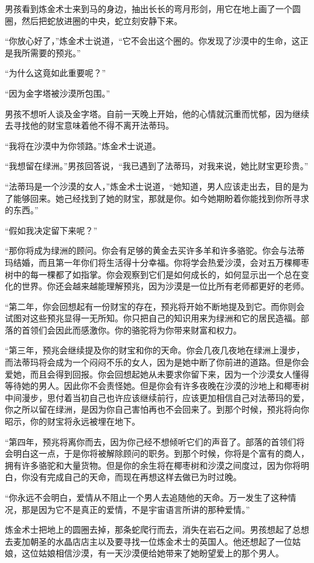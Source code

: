 \documentclass[twoside,openany]{book}
\begin{document}
男孩看到炼金术士来到马的身边，抽出长长的弯月形剑，用它在地上画了一个圆圈，然后把蛇放进圈的中央，蛇立刻安静下来。

“你放心好了，”炼金术士说道，“它不会出这个圈的。你发现了沙漠中的生命，这正是我所需要的预兆。”

“为什么这竟如此重要呢？”

“因为金字塔被沙漠所包围。”

男孩不想听人谈及金字塔。自前一天晚上开始，他的心情就沉重而忧郁，因为继续去寻找他的财宝意味着他不得不离开法蒂玛。

“我将在沙漠中为你领路。”炼金术士说道。

“我想留在绿洲。”男孩回答说，“我已遇到了法蒂玛，对我来说，她比财宝更珍贵。”

“法蒂玛是一个沙漠的女人，”炼金术士说道，“她知道，男人应该走出去，目的是为了能够回来。她己经找到了她的财宝，那就是你。如今她期盼着你能找到你所寻求的东西。”

“假如我决定留下来呢？”

“那你将成为绿洲的顾问。你会有足够的黄金去买许多羊和许多骆驼。你会与法蒂玛结婚，而且第一年你们将生活得十分幸福。你将学会热爱沙漠，会对五万棵椰枣树中的每一棵都了如指掌。你会观察到它们是如何成长的，如何显示出一个总在变化的世界。你还会越来越能理解预兆，因为沙漠是一位比所有老师都更好的老师。

“第二年，你会回想起有一份财宝的存在，预兆将开始不断地提及到它。而你则会试图对这些预兆显得一无所知。你只把自己的知识用来为绿洲和它的居民造福。部落的首领们会因此而感激你。你的骆驼将为你带来财富和权力。

“第三年，预兆会继续提及你的财宝和你的天命。你会几夜几夜地在绿洲上漫步，而法蒂玛将会成为一个闷闷不乐的女人，因为是她中断了你前进的道路。但是你会爱她，而且会得到回报。你会回想起她从未要求你留下来，因为一个沙漠女人懂得等待她的男人。因此你不会责怪她。但是你会有许多夜晚在沙漠的沙地上和椰枣树中间漫步，思付着当初自己也许应该继续前行，应该更加相信自己对法蒂玛的爱，你之所以留在绿洲，是因为你自己害怕再也不会回来了。到那个时候，预兆将向你昭示，你的财宝将永远被埋在地下。

“第四年，预兆将离你而去，因为你己经不想倾听它们的声音了。部落的首领们将会明白这一点，于是你将被解除顾问的职务。到那个时候，你将是个富有的商人，拥有许多骆驼和大量货物。但是你的余生将在椰枣树和沙漠之间度过，因为你将明白，你没有完成自己的天命，而现在再想这样去做已为时过晚。

“你永远不会明白，爱情从不阻止一个男人去追随他的天命。万一发生了这种情况，那是因为它不是真正的爱情，不是宇宙语言所讲的那种爱情。”

炼金术士把地上的圆圈去掉，那条蛇爬行而去，消失在岩石之间。男孩想起了总想去麦加朝圣的水晶店店主以及要寻找一位炼金术士的英国人。他还想起了一位姑娘，这位姑娘相信沙漠，有一天沙漠便给她带来了她盼望爱上的那个男人。
\end{document}
